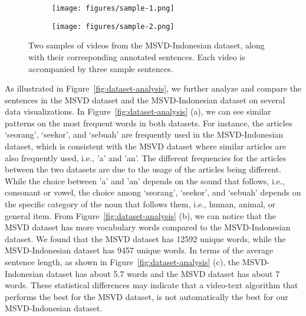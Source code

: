 \documentclass{article}
\begin{document}
\begin{figure}[t!]
  \centering  
  \begin{subfigure}[b]{0.495\textwidth}
    \centering
    \texttt{[image: figures/sample-1.png]}
    \caption{}
    \label{fig:sample1}
  \end{subfigure}
  \hfill
  \begin{subfigure}[b]{0.495\textwidth}
    \centering
    \texttt{[image: figures/sample-2.png]}
    \caption{}
    \label{fig:sample2}
  \end{subfigure}
  
  \caption{Two samples of videos from the MSVD-Indonesian dataset, along with their corresponding annotated sentences. Each video is accompanied by three sample sentences.}
  \label{fig:sample-dataset}
\end{figure}


As illustrated in Figure~\ref{fig:dataset-analysis}, we further analyze and compare the sentences in the MSVD dataset and the MSVD-Indonesian dataset on several data visualizations. In Figure~\ref{fig:dataset-analysis} (a), we can see similar patterns on the most frequent words in both datasets. For instance, the articles `seorang', `seekor', and `sebuah' are frequently used in the MSVD-Indonesian dataset, which is consistent with the MSVD dataset where similar articles are also frequently used, i.e., 'a' and 'an'. The different frequencies for the articles between the two datasets are due to the usage of the articles being different. While the choice between 'a' and 'an' depends on the sound that follows, i.e., consonant or vowel, the choice among `seorang', `seekor', and `sebuah'  depends on the specific category of the noun that follows them, i.e., human, animal, or general item.  From Figure~\ref{fig:dataset-analysis} (b), we can notice that the MSVD dataset has more vocabulary words compared to the MSVD-Indonesian dataset. We found that the MSVD dataset has 12592 unique words, while the MSVD-Indonesian dataset has 9457 unique words. In terms of the average sentence length, as shown in Figure~\ref{fig:dataset-analysis} (c), the MSVD-Indonesian dataset has about 5.7 words and the MSVD dataset has about 7 words. These statistical differences may indicate that a video-text algorithm that performs the best for the MSVD dataset, is not automatically the best for our MSVD-Indonesian dataset.
\end{document}
